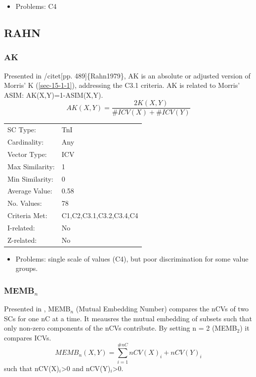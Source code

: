 \documentclass{article}
\begin{document}
\begin{itemize}
\item Problems: C4
\end{itemize}
\subsection{RAHN}
\label{sec-15-5}
\subsubsection{AK}
\label{sec-15-5-1}

Presented in /citet[pp. 489]\{Rahn1979\}, AK is an absolute or adjusted
version of Morris' K (\ref{sec-15-1-1}), addressing the C3.1 criteria. AK is related
to Morris' ASIM: AK(X,Y)=1-ASIM(X,Y).
$$AK\left(X,Y\right)=\frac{2K\left(X,Y\right)}{\#ICV\left(X\right)+\#ICV\left(Y\right)}$$

\begin{center}
\begin{tabular}{ll}
 SC Type:         &  TnI                      \\
 Cardinality:     &  Any                      \\
 Vector Type:     &  ICV                      \\
 Max Similarity:  &  1                        \\
 Min Similarity:  &  0                        \\
 Average Value:   &  0.58                     \\
 No. Values:      &  78                       \\
 Criteria Met:    &  C1,C2,C3.1,C3.2,C3.4,C4  \\
 I-related:       &  No                       \\
 Z-related:       &  No                       \\
\end{tabular}
\end{center}


\begin{itemize}
\item Problems: single scale of values (C4), but poor discrimination for
  some value groups.
\end{itemize}
\subsubsection{MEMB$_{n}$}
\label{sec-15-5-2}

Presented in \citet[pp. 492]{Rahn1979}, MEMB$_{n}$ (Mutual Embedding
Number) compares the nCVs of two SCs for one nC at a time. It meausres
the mutual embedding of subsets such that only non-zero components of
the nCVs contribute. By setting n = 2 (MEMB$_{2}$) it compares ICVs.
$$MEMB_{n}\left(X,Y\right)=\sum_{i=1}^{\#nC}{nCV(X)_{i}+nCV(Y)_{i}}$$
such that nCV(X)$_{i}$>0 and nCV(Y)$_{i}$>0. 
\end{document}
